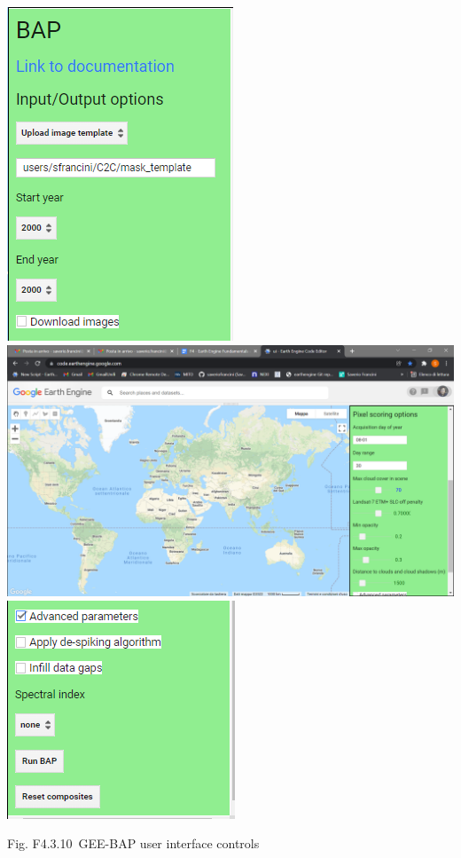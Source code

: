 \documentclass[
  letterpaper,
  DIV=11,
  numbers=noendperiod]{scrreprt}
\begin{document}
\includegraphics{./F4/image70.png}\includegraphics{./F4/image81.png}\includegraphics{./F4/image83.png}

Fig. F4.3.10~GEE-BAP user interface controls
\end{document}
